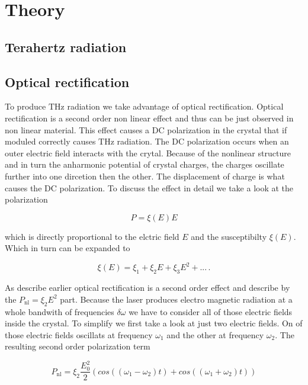 \chapter{Theory}
\section{Terahertz radiation}

\section{Optical rectification}\label{sec:optic_ref}
To produce $\si{\tera\hertz}$ radiation we take advantage of optical rectification.
Optical rectification is a second order non linear effect and thus can be just observed in non linear material.
This effect causes a DC polarization in the crystal that if moduled correctly causes $\si{\tera\hertz}$ radiation.
The DC polarization occurs when an outer electric field interacts with the crytal.
Because of the nonlinear structure and in turn the anharmonic potential of crystal charges, the charges oscillate further into one dircetion then the other.
The displacement of charge is what causes the DC polarization.
To discuss the effect in detail we take a look at the polarization

\begin{equation}
P = \xi(E) E
\end{equation}

which is directly proportional to the elctric field $E$ and the susceptibilty $\xi(E)$.
Which in turn can be expanded to 

\begin{equation}
    \xi(E) = \xi_1 + \xi_2 E +\xi_3 E^2 + ...   \, .
\end{equation}

As describe earlier optical rectification is a second order effect and describe by the $P_\text{nl} = \xi_2 E^2$ part.
Because the laser produces electro magnetic radiation at a whole bandwith of frequencies $\delta\omega$ we have to consider all of those electric fields inside the crystal.
To simplify we first take a look at just two electric fields.
On of those electric fields oscillats at frequency $\omega_1$ and the other at frequency $\omega_2$.
The resulting second order polarization term 

\begin{equation}
    P_\text{nl} = \xi_2 \frac{E_0^2}{2}\left(cos((\omega_1 - \omega_2)t) + cos((\omega_1 + \omega_2)t)\right)
\end{equation}

